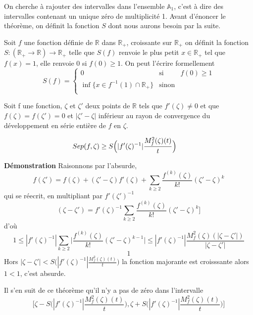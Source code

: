 \documentclass[a4paper,10.5pt]{article}
\begin{document}
	\noindent On cherche à rajouter des intervalles dans l'ensemble $\mathbb{A}_1$, c'est à dire des intervalles contenant un unique zéro de multiplicité 1.
	Avant d'énoncer le théorème, on définit la fonction $S$ dont nous aurons besoin par la suite. 
	\begin{definition} Soit $f$ une fonction définie de $\mathbb{R}$ dans $\mathbb{R}_+$, croissante sur $\mathbb{R}_+$ on définit la fonction $S:(\mathbb{R}_+ \rightarrow \mathbb{R}) \longrightarrow \mathbb{R}_+$  telle que $S(f)$ renvoie le plus petit $x \in \mathbb{R}_+$ tel que $f(x)=1$, elle renvoie 0 si $f(0) \geq1$. On  peut l'écrire formellement
		\begin{equation}
		S(f)=
		\left\lbrace
		\begin{array}{ccc}
		0  & \mbox{si} & f(0) \geq 1\\
		\inf \{x \in f^{-1}(1)\cap \mathbb{R}_{+}\} & \mbox{sinon}\\
		\end{array}\right.
		\end{equation}
	\end{definition}
	\begin{theorem}	Soit f une fonction, $\zeta$ et $\zeta '$ deux points de $\mathbb{R}$ tels que $f'(\zeta)\neq 0$ et que $f(\zeta)=f(\zeta ')=0$ et $|\zeta '-\zeta|$ inférieur au rayon de convergence du développement en série entière de $f$ en $\zeta$. 
		
		\[Sep(f,\zeta) \geq S\Big(|f'(\zeta)^{-1}|\frac{M_{f}^{2}(\zeta)(t)}{t}\Big) \hspace{4mm} \]
	\end{theorem}

	\noindent \textbf{Démonstration} Raisonnons par l'absurde, 
	\[f(\zeta ')=f(\zeta)+(\zeta '-\zeta)f'(\zeta)+ \sum_{k \geq 2}\frac{f^{(k)}(\zeta)}{k!}(\zeta'-\zeta)^k\]
	qui se réecrit, en multipliant par $f'(\zeta ')^{-1}$
	\[(\zeta-\zeta')=f'(\zeta)^{-1} \sum_{k \geq 2}\frac{f^{(k)}(\zeta)}{k!}(\zeta'-\zeta)^k]\]
	d'où 
	\[1 \leq |f'(\zeta)^{-1}|\sum_{k \geq 2}  \big|\frac{f^{(k)}(\zeta)}{k!}(\zeta'-\zeta)^{k-1} \big|\leq |f'(\zeta)^{-1}| \frac{M_{f}^{2}(\zeta)(|\zeta-\zeta'|)}{|\zeta-\zeta'|}\]
	\[1 \]
	Hors $|\zeta-\zeta'|<S\Big(|f'(\zeta)^{-1}|\frac{M_{f}^{2}(\zeta)(t)}{t}\Big)$ la fonction majorante est croisssante alors $1<1$, c'est absurde.
	
	\noindent Il s'en suit de ce théorème qu'il n'y a pas de zéro dans l'intervalle \[\Big[\zeta-S\Big(|f'(\zeta)^{-1}|\frac{M_{f}^{2}(\zeta)(t)}{t}\Big),\zeta+S\Big(|f'(\zeta)^{-1}|\frac{M_{f}^{2}(\zeta)(t)}{t}\Big)\Big]\]
	
\end{document}
